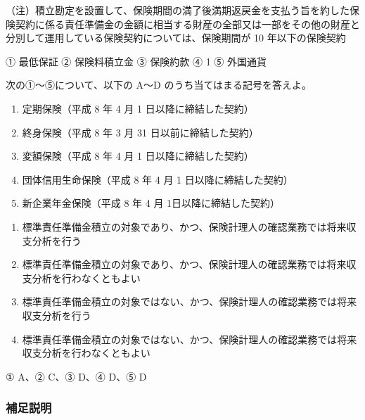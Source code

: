 \documentclass[report,gutter=10mm,fore-edge=10mm,uplatex,dvipdfmx]{jlreq}
\begin{document}
（注）積立勘定を設置して、保険期間の満了後満期返戻金を支払う旨を約した保険契約に係る責任準備金の金額に相当する財産の全部又は一部をその他の財産と分別して運用している保険契約については、保険期間が
10 年以下の保険契約



① 最低保証 ② 保険料積立金 ③ 保険約款 ④ 1 ⑤ 外国通貨


次の①～⑤について、以下の A～D のうち当てはまる記号を答えよ。
\begin{enumerate} [(1)]
\item 定期保険（平成 8 年 4 月 1 日以降に締結した契約）
\item 終身保険（平成 8 年 3 月 31 日以前に締結した契約）
\item 変額保険（平成 8 年 4 月 1 日以降に締結した契約）
\item 団体信用生命保険（平成 8 年 4 月 1 日以降に締結した契約）
\item 新企業年金保険（平成 8 年 4 月 1日以降に締結した契約）
\end{enumerate} 

\begin{enumerate} [A ]
\item 標準責任準備金積立の対象であり、かつ、保険計理人の確認業務では将来収支分析を行う
\item 標準責任準備金積立の対象であり、かつ、保険計理人の確認業務では将来収支分析を行わなくともよい
\item 標準責任準備金積立の対象ではない、かつ、保険計理人の確認業務では将来収支分析を行う
\item 標準責任準備金積立の対象ではない、かつ、保険計理人の確認業務では将来収支分析を行わなくともよい
\end{enumerate}


① A、② C、③ D、④ D、⑤ D

\subsubsection{補足説明}
\end{document}
